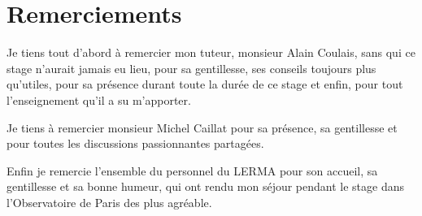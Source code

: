 \section*{Remerciements}

Je tiens tout d’abord à remercier mon tuteur, monsieur Alain Coulais, sans qui ce stage n’aurait jamais eu lieu, pour sa gentillesse, ses conseils toujours plus qu’utiles, pour sa présence durant toute la durée de ce stage et enfin, pour tout l’enseignement qu’il a su m’apporter.



Je tiens à remercier monsieur Michel Caillat pour sa présence, sa gentillesse et pour toutes
les discussions passionnantes partagées.

Enfin je remercie l’ensemble du personnel du LERMA pour son accueil, sa gentillesse et sa bonne humeur, qui ont rendu mon séjour pendant le stage dans l'Observatoire de Paris des plus agréable.